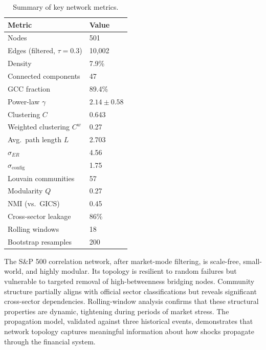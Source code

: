 \documentclass[11pt, a4paper]{article}
\begin{document}
\begin{table}[H]
\centering
\caption{Summary of key network metrics.}
\begin{tabular}{ll}
\toprule
\textbf{Metric} & \textbf{Value} \\
\midrule
Nodes & 501 \\
Edges (filtered, $\tau = 0.3$) & 10,002 \\
Density & 7.9\% \\
Connected components & 47 \\
GCC fraction & 89.4\% \\
Power-law $\gamma$ & $2.14 \pm 0.58$ \\
Clustering $C$ & 0.643 \\
Weighted clustering $C^w$ & 0.27 \\
Avg.\ path length $L$ & 2.703 \\
$\sigma_{ER}$ & 4.56 \\
$\sigma_{\text{config}}$ & 1.75 \\
Louvain communities & 57 \\
Modularity $Q$ & 0.27 \\
NMI (vs.\ GICS) & 0.45 \\
Cross-sector leakage & 86\% \\
Rolling windows & 18 \\
Bootstrap resamples & 200 \\
\bottomrule
\end{tabular}
\end{table}

The S\&P 500 correlation network, after market-mode filtering, is scale-free, small-world, and highly modular. Its topology is resilient to random failures but vulnerable to targeted removal of high-betweenness bridging nodes. Community structure partially aligns with official sector classifications but reveals significant cross-sector dependencies. Rolling-window analysis confirms that these structural properties are dynamic, tightening during periods of market stress. The propagation model, validated against three historical events, demonstrates that network topology captures meaningful information about how shocks propagate through the financial system.
\end{document}
